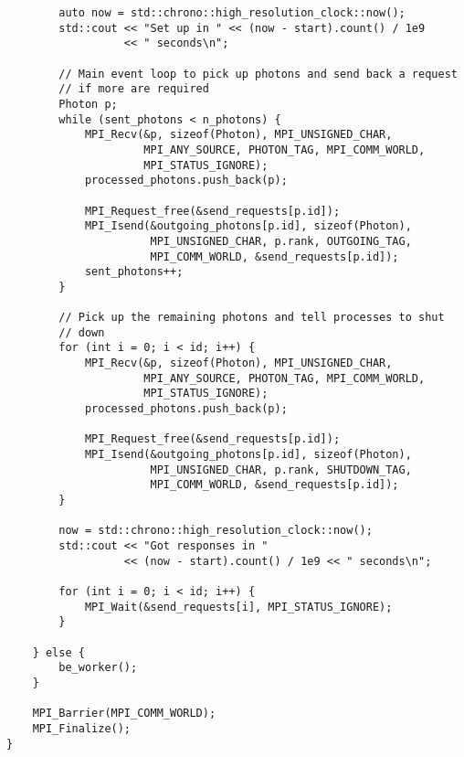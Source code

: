 \begin{lstlisting}
        auto now = std::chrono::high_resolution_clock::now();
        std::cout << "Set up in " << (now - start).count() / 1e9
                  << " seconds\n";

        // Main event loop to pick up photons and send back a request
        // if more are required
        Photon p;
        while (sent_photons < n_photons) {
            MPI_Recv(&p, sizeof(Photon), MPI_UNSIGNED_CHAR,
                     MPI_ANY_SOURCE, PHOTON_TAG, MPI_COMM_WORLD,
                     MPI_STATUS_IGNORE);
            processed_photons.push_back(p);

            MPI_Request_free(&send_requests[p.id]);
            MPI_Isend(&outgoing_photons[p.id], sizeof(Photon),
                      MPI_UNSIGNED_CHAR, p.rank, OUTGOING_TAG,
                      MPI_COMM_WORLD, &send_requests[p.id]);
            sent_photons++;
        }

        // Pick up the remaining photons and tell processes to shut
        // down
        for (int i = 0; i < id; i++) {
            MPI_Recv(&p, sizeof(Photon), MPI_UNSIGNED_CHAR,
                     MPI_ANY_SOURCE, PHOTON_TAG, MPI_COMM_WORLD,
                     MPI_STATUS_IGNORE);
            processed_photons.push_back(p);

            MPI_Request_free(&send_requests[p.id]);
            MPI_Isend(&outgoing_photons[p.id], sizeof(Photon),
                      MPI_UNSIGNED_CHAR, p.rank, SHUTDOWN_TAG,
                      MPI_COMM_WORLD, &send_requests[p.id]);
        }

        now = std::chrono::high_resolution_clock::now();
        std::cout << "Got responses in "
                  << (now - start).count() / 1e9 << " seconds\n";

        for (int i = 0; i < id; i++) {
            MPI_Wait(&send_requests[i], MPI_STATUS_IGNORE);
        }

    } else {
        be_worker();
    }

    MPI_Barrier(MPI_COMM_WORLD);
    MPI_Finalize();
}
\end{lstlisting}
